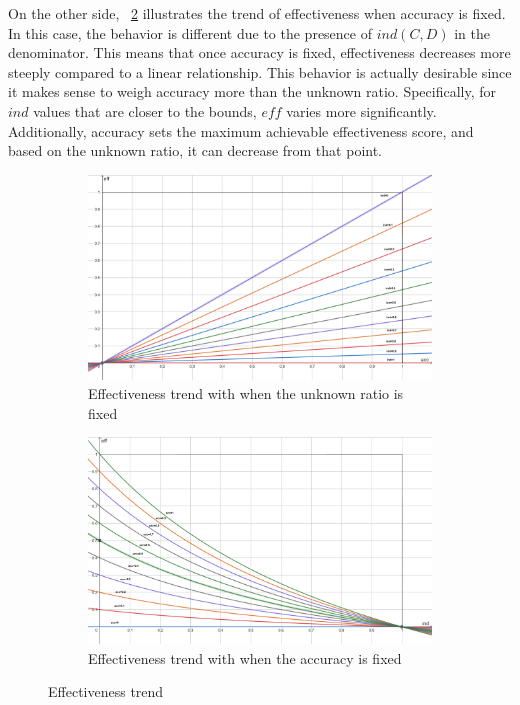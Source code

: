 On the other side, \Fig~\ref{fig:eff_vs_ind}  illustrates the trend of effectiveness when accuracy is fixed. In this case, the behavior is different due to the presence of $ind(C,D)$ in the denominator.
This means that once accuracy is fixed, effectiveness decreases more steeply compared to a linear relationship. This behavior is actually desirable since it makes sense to weigh accuracy more than the unknown ratio. Specifically, for $ind$ values that are closer to the bounds, $eff$ varies more significantly. Additionally, accuracy sets the maximum achievable effectiveness score, and based on the unknown ratio, it can decrease from that point.

\begin{figure}[h]
	\centering
	\begin{subfigure}{.5\textwidth}
		\centering
		\includegraphics[width=0.9\linewidth]{ImageFiles/BNNRob/eff_vs_acc}
		\caption{Effectiveness trend with when the unknown ratio is fixed}
		\label{fig:eff_vs_acc}
	\end{subfigure}%
	\begin{subfigure}{.5\textwidth}
		\centering
		\includegraphics[width=0.9\linewidth]{ImageFiles/BNNRob/eff_vs_ind}
		\caption{Effectiveness trend with when the accuracy is fixed}
		\label{fig:eff_vs_ind}
	\end{subfigure}
	\caption{Effectiveness trend}
	\label{fig:eff_vs}
\end{figure}

